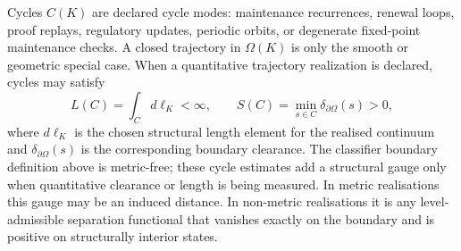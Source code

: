 Cycles \(C(K)\) are declared cycle modes: maintenance recurrences, renewal
loops, proof replays, regulatory updates, periodic orbits, or degenerate
fixed-point maintenance checks. A closed trajectory in \(\Omega(K)\) is only
the smooth or geometric special case.
When a quantitative trajectory realization is declared, cycles may satisfy
\[
    L(C) = \int_C d\ell_K < \infty,\qquad
    S(C) = \min_{s \in C} \delta_{\partial\Omega}(s) > 0,
\]
where \(d\ell_K\) is the chosen structural length element for the realised
continuum and \(\delta_{\partial\Omega}(s)\) is the corresponding boundary
clearance.
The classifier boundary definition above is metric-free; these cycle estimates
add a structural gauge only when quantitative clearance or length is being measured.
In metric realisations this gauge may be an induced distance. In non-metric
realisations it is any level-admissible separation functional that vanishes
exactly on the boundary and is positive on structurally interior states.

